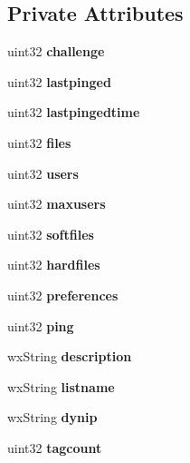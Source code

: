 \subsection*{Private Attributes}
\begin{DoxyCompactItemize}
\item 
uint32 {\bfseries challenge}\label{classCServer_afa4aa5e0e5b05649d103669d6d72177f}

\item 
uint32 {\bfseries lastpinged}\label{classCServer_ac61f171cdf09ef2e74530f19886ee951}

\item 
uint32 {\bfseries lastpingedtime}\label{classCServer_a72573bfabb502ac66f80c6473433f25c}

\item 
uint32 {\bfseries files}\label{classCServer_a834af66abf31fafbc49f97145ec01443}

\item 
uint32 {\bfseries users}\label{classCServer_a71f50969f551ac68ea688e0ece013990}

\item 
uint32 {\bfseries maxusers}\label{classCServer_aad26e4955778cb5429434d35cb01f8b7}

\item 
uint32 {\bfseries softfiles}\label{classCServer_a9d0108fab6b260dd964ce61e5cd977b0}

\item 
uint32 {\bfseries hardfiles}\label{classCServer_acefda09fd6fe2cfb30424020a7ed60a6}

\item 
uint32 {\bfseries preferences}\label{classCServer_acf2bdd0fa84145bc7befe4e2ea2e0c17}

\item 
uint32 {\bfseries ping}\label{classCServer_aa59e8c5b2f9078301e0613f4fbca589d}

\item 
wxString {\bfseries description}\label{classCServer_ad2129c539ff857f3e8808e32b25f2d5c}

\item 
wxString {\bfseries listname}\label{classCServer_ade6744a5eef14200c21211b887996966}

\item 
wxString {\bfseries dynip}\label{classCServer_afa6c23aa138f9a4628ab7bff159691e6}

\item 
uint32 {\bfseries tagcount}\label{classCServer_a54435d47e9e2013153f787fb350f955a}


\end{DoxyCompactItemize}
